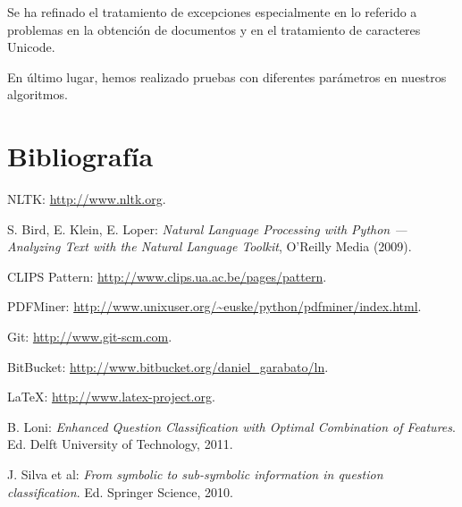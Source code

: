 \documentclass[12pt,a4paper,titlepage]{article}
\begin{document}
Se ha refinado el tratamiento de excepciones especialmente en lo referido a problemas en la obtención de documentos y en el tratamiento de caracteres Unicode.

En último lugar, hemos realizado pruebas con diferentes parámetros en nuestros algoritmos.

\clearpage
\section{Bibliografía}
\begin{thebibliography}{99}

NLTK: \url{http://www.nltk.org}.

S. Bird, E. Klein, E. Loper: \emph{Natural Language Processing with Python --- Analyzing Text with the Natural Language Toolkit}, O'Reilly Media (2009).

CLIPS Pattern: \url{http://www.clips.ua.ac.be/pages/pattern}.

PDFMiner: \url{http://www.unixuser.org/~euske/python/pdfminer/index.html}.

Git: \url{http://www.git-scm.com}.

BitBucket: \url{http://www.bitbucket.org/daniel_garabato/ln}.

\LaTeX: \url{http://www.latex-project.org}.

B. Loni: \emph{Enhanced Question Classification with Optimal Combination of Features}. Ed. Delft University of Technology, 2011.

J. Silva et al: \emph{From symbolic to sub-symbolic information in question classification}. Ed. Springer Science, 2010.

\end{thebibliography}
\end{document}
